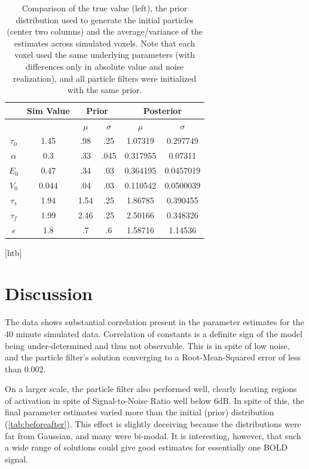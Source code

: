 \documentclass{article}
\begin{document}
\begin{table}[t]
\ninept
  \centering
\begin{tabular}{| c | c | c | c | c | c |}
\hline
& Sim Value & \multicolumn{2}{|c|}{Prior} &\multicolumn{2}{|c|}{Posterior} \\
\hline
        &       &$\mu$  & $\sigma$& $\mu$& $\sigma$\\
\hline
$\tau_0  $& 1.45  & .98   & .25     & 1.07319 & 0.297749  \\
\rowcolor[gray]{.8} 
$\alpha  $&0.3    & .33   & .045    & 0.317955& 0.07311  \\
$E_0     $& 0.47  & .34   & .03     & 0.364195& 0.0457019  \\
\rowcolor[gray]{.8} 
$V_0     $& 0.044 & .04   & .03     & 0.110542& 0.0500039  \\
$\tau_s  $& 1.94  & 1.54  & .25     & 1.86785 & 0.390455  \\
\rowcolor[gray]{.8} 
$\tau_f  $& 1.99  & 2.46  & .25     & 2.50166 & 0.348326  \\
$\epsilon$& 1.8   & .7    & .6      & 1.58716 & 1.14536  \\
\hline
\end{tabular}
\caption{Comparison of the true value (left), the prior distribution
used to generate the initial particles (center two columns) and the 
average/variance of the estimates across simulated voxels. Note that
each voxel used the same underlying parameters (with differences only
in absolute value and noise realization), and all particle filters
were initialized with the same prior.}
\label{tab:beforeafter}
\end{table}[htb]

\section{Discussion}
\label{sec:Conclusion}
The data shows substantial correlation present in the parameter 
estimates for the 40 minute simulated data. Correlation of 
constants is a definite sign of the model being under-determined
and thus not observable. This is in spite of low noise, and the 
particle filter's solution converging to a Root-Mean-Squared error
of less than $0.002$. 

On a larger scale, the particle filter also performed well, clearly
locating regions of activation in spite of Signal-to-Noise Ratio 
well below 6dB. In spite of this, the final parameter estimates 
varied more than the initial (prior) distribution (\autoref{tab:beforeafter}).
This effect is slightly deceiving because the distributions
were far from Gaussian, and many were bi-modal. It is 
interesting, however, that such a wide range of solutions
could give good estimates for essentially one BOLD signal. 
\end{document}
